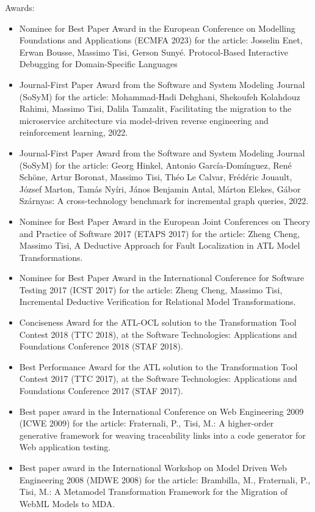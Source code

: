 \medskip
Awards: 
\begin{itemize}
\item Nominee for Best Paper Award in the European Conference on Modelling Foundations and Applications (ECMFA 2023) for the article: Josselin Enet, Erwan Bousse, Massimo Tisi, Gerson Sunyé. Protocol-Based Interactive Debugging for Domain-Specific Languages
\item Journal-First Paper Award from the Software and System Modeling Journal (SoSyM) for the article: Mohammad-Hadi Dehghani, Shekoufeh Kolahdouz Rahimi, Massimo Tisi, Dalila Tamzalit, Facilitating the migration to the microservice architecture via model-driven reverse engineering and reinforcement learning, 2022.
\item Journal-First Paper Award from the Software and System Modeling Journal (SoSyM) for the article: Georg Hinkel, Antonio García-Domínguez, René Schöne, Artur Boronat, Massimo Tisi, Théo Le Calvar, Frédéric Jouault, József Marton, Tamás Nyíri, János Benjamin Antal, Márton Elekes, Gábor Szárnyas: A cross-technology benchmark for incremental graph queries, 2022.
\item Nominee for Best Paper Award in the European Joint Conferences on Theory and Practice of Software 2017 (ETAPS 2017) for the article: Zheng Cheng, Massimo Tisi, A Deductive Approach for Fault Localization in ATL Model Transformations.
\item Nominee for Best Paper Award in the International Conference for Software Testing 2017 (ICST 2017) for the article: Zheng Cheng, Massimo Tisi, Incremental Deductive Verification for Relational Model Transformations.
\item Conciseness Award for the ATL-OCL solution to the Transformation Tool Contest 2018 (TTC 2018), at the Software Technologies: Applications and Foundations Conference 2018 (STAF 2018).
\item Best Performance Award for the ATL solution to the Transformation Tool Contest 2017 (TTC 2017), at the Software Technologies: Applications and Foundations Conference 2017 (STAF 2017).
\item Best paper award in the International Conference on Web Engineering 2009 (ICWE 2009) for the article: Fraternali, P., Tisi, M.: A higher-order generative framework for weaving traceability links into a code generator for Web application testing.
\item Best paper award in the International Workshop on Model Driven Web Engineering 2008 (MDWE 2008) for the article: Brambilla, M., Fraternali, P., Tisi, M.: A Metamodel Transformation Framework for the Migration of WebML Models to MDA.
\end{itemize}

